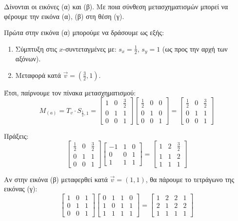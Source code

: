 \begin{exercise}
Δίνονται οι εικόνες (α) και (β). Με ποια σύνθεση μετασχηματισμών μπορεί να φέρουμε την εικόνα (α), (β) στη θέση (γ).

%

\end{exercise}

\begin{solution}
Πρώτα στην εικόνα (α) μπορούμε να δράσουμε ως εξής:
\begin{enumerate}
    \item Σύμπτυξη στις $x$-συντεταγμένες με: \(s_x = \frac{1}{2}\), \(s_y = 1\) (ως προς την αρχή των αξόνων).
    \item Μεταφορά κατά \(\vec{v} = (\frac{3}{2},1) \).
\end{enumerate}

Έτσι, παίρνουμε τον πίνακα μετασχηματισμού:
\[
M_{(a)} = T_v \cdot S_{\frac{1}{2},1} = \begin{bmatrix}
1 & 0 & \frac{3}{2} \\
0 & 1 & 1 \\
0 & 0 & 1
\end{bmatrix}
\begin{bmatrix}
\frac{1}{2} & 0 & 0 \\
0 & 1 & 0 \\
0 & 0 & 1
\end{bmatrix} = \begin{bmatrix}
\frac{1}{2} & 0 & \frac{3}{2} \\
0 & 1 & 1 \\
0 & 0 & 1
\end{bmatrix}
\]

Πράξεις:
\[
\begin{bmatrix}
\frac{1}{2} & 0 & \frac{3}{2} \\
0 & 1 & 1 \\
0 & 0 & 1
\end{bmatrix}
\begin{bmatrix}
-1 & 1 & 0 \\
0 & 0 & 1 \\
1 & 1 & 1
\end{bmatrix} = \begin{bmatrix}
1 & 2 & \frac{3}{2} \\
1 & 1 & 2 \\
1 & 1 & 1
\end{bmatrix}
\]


Αν στην εικόνα (β) μεταφερθεί κατά \(\vec{v} = (1,1)\), θα πάρουμε το τετράγωνο της εικόνας (γ):
\[
\begin{bmatrix}
1 & 0 & 1 \\
0 & 1 & 1 \\
0 & 0 & 1
\end{bmatrix}
\begin{bmatrix}
0 & 1 & 1 & 0 \\
1 & 0 & 1 & 1 \\
1 & 1 & 1 & 1
\end{bmatrix} = \begin{bmatrix}
1 & 2 & 2 & 1 \\
2 & 1 & 2 & 2 \\
1 & 1 & 1 & 1
\end{bmatrix}
\]

\end{solution}
